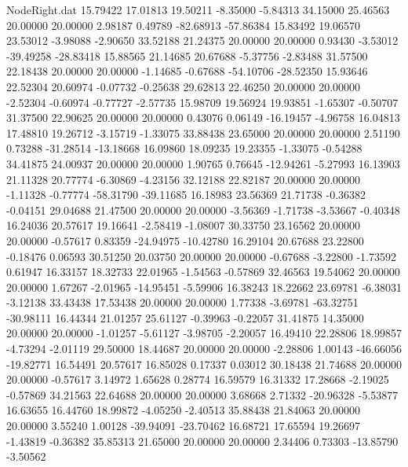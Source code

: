 \begin{filecontents}{NodeRight.dat}
  15.79422   17.01813   19.50211    -8.35000   -5.84313   34.15000   25.46563   20.00000   20.00000    2.98187    0.49789  -82.68913  -57.86384
  15.83492   19.06570   23.53012    -3.98088   -2.90650   33.52188   21.24375   20.00000   20.00000    0.93430   -3.53012  -39.49258  -28.83418
  15.88565   21.14685   20.67688    -5.37756   -2.83488   31.57500   22.18438   20.00000   20.00000   -1.14685   -0.67688  -54.10706  -28.52350
  15.93646   22.52304   20.60974    -0.07732   -0.25638   29.62813   22.46250   20.00000   20.00000   -2.52304   -0.60974   -0.77727   -2.57735
  15.98709   19.56924   19.93851    -1.65307   -0.50707   31.37500   22.90625   20.00000   20.00000    0.43076    0.06149  -16.19457   -4.96758
  16.04813   17.48810   19.26712    -3.15719   -1.33075   33.88438   23.65000   20.00000   20.00000    2.51190    0.73288  -31.28514  -13.18668
  16.09860   18.09235   19.23355    -1.33075   -0.54288   34.41875   24.00937   20.00000   20.00000    1.90765    0.76645  -12.94261   -5.27993
  16.13903   21.11328   20.77774    -6.30869   -4.23156   32.12188   22.82187   20.00000   20.00000   -1.11328   -0.77774  -58.31790  -39.11685
  16.18983   23.56369   21.71738    -0.36382   -0.04151   29.04688   21.47500   20.00000   20.00000   -3.56369   -1.71738   -3.53667   -0.40348
  16.24036   20.57617   19.16641    -2.58419   -1.08007   30.33750   23.16562   20.00000   20.00000   -0.57617    0.83359  -24.94975  -10.42780
  16.29104   20.67688   23.22800    -0.18476    0.06593   30.51250   20.03750   20.00000   20.00000   -0.67688   -3.22800   -1.73592    0.61947
  16.33157   18.32733   22.01965    -1.54563   -0.57869   32.46563   19.54062   20.00000   20.00000    1.67267   -2.01965  -14.95451   -5.59906
  16.38243   18.22662   23.69781    -6.38031   -3.12138   33.43438   17.53438   20.00000   20.00000    1.77338   -3.69781  -63.32751  -30.98111
  16.44344   21.01257   25.61127    -0.39963   -0.22057   31.41875   14.35000   20.00000   20.00000   -1.01257   -5.61127   -3.98705   -2.20057
  16.49410   22.28806   18.99857    -4.73294   -2.01119   29.50000   18.44687   20.00000   20.00000   -2.28806    1.00143  -46.66056  -19.82771
  16.54491   20.57617   16.85028     0.17337    0.03012   30.18438   21.74688   20.00000   20.00000   -0.57617    3.14972    1.65628    0.28774
  16.59579   16.31332   17.28668    -2.19025   -0.57869   34.21563   22.64688   20.00000   20.00000    3.68668    2.71332  -20.96328   -5.53877
  16.63655   16.44760   18.99872    -4.05250   -2.40513   35.88438   21.84063   20.00000   20.00000    3.55240    1.00128  -39.94091  -23.70462
  16.68721   17.65594   19.26697    -1.43819   -0.36382   35.85313   21.65000   20.00000   20.00000    2.34406    0.73303  -13.85790   -3.50562

\end{filecontents}
